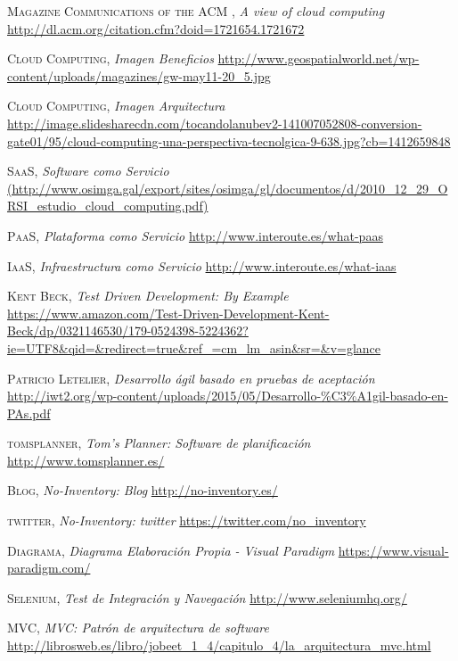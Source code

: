 \documentclass[a4paper,11pt]{book}
\begin{document}
\begin{thebibliography}{aaaa}
 \textsc{Magazine Communications of the ACM },
\textit{A view of cloud computing}
\url{http://dl.acm.org/citation.cfm?doid=1721654.1721672}


 \textsc{Cloud Computing},
\textit{Imagen Beneficios}
\url{http://www.geospatialworld.net/wp-content/uploads/magazines/gw-may11-20_5.jpg}

 \textsc{Cloud Computing},
\textit{Imagen Arquitectura}
\url{http://image.slidesharecdn.com/tocandolanubev2-141007052808-conversion-gate01/95/cloud-computing-una-perspectiva-tecnolgica-9-638.jpg?cb=1412659848}

 \textsc{SaaS},
\textit{Software como Servicio}
\url{(http://www.osimga.gal/export/sites/osimga/gl/documentos/d/2010_12_29_ORSI_estudio_cloud_computing.pdf)} 

 \textsc{PaaS},
\textit{Plataforma como Servicio}
\url{http://www.interoute.es/what-paas} 

 \textsc{IaaS},
\textit{Infraestructura como Servicio}
\url{http://www.interoute.es/what-iaas} 

 \textsc{Kent Beck},
\textit{Test Driven Development: By Example}
\url{https://www.amazon.com/Test-Driven-Development-Kent-Beck/dp/0321146530/179-0524398-5224362?ie=UTF8&qid=&redirect=true&ref_=cm_lm_asin&sr=&v=glance}


 \textsc{Patricio Letelier},
\textit{Desarrollo ágil basado en pruebas de aceptación}
\url{http://iwt2.org/wp-content/uploads/2015/05/Desarrollo-\%C3\%A1gil-basado-en-PAs.pdf}

 \textsc{tomsplanner},
\textit{Tom's Planner: Software de planificación}
\url{http://www.tomsplanner.es/}

 \textsc{Blog},
\textit{No-Inventory: Blog}
\url{http://no-inventory.es/}

 \textsc{twitter},
\textit{No-Inventory: twitter}
\url{https://twitter.com/no_inventory}

 \textsc{Diagrama},
\textit{Diagrama Elaboración Propia - Visual Paradigm}
\url{https://www.visual-paradigm.com/}




 \textsc{Selenium},
\textit{Test de Integración y Navegación}
\url{http://www.seleniumhq.org/}

 \textsc{MVC},
\textit{MVC: Patrón de arquitectura de software }
\url{http://librosweb.es/libro/jobeet_1_4/capitulo_4/la_arquitectura_mvc.html}


\end{thebibliography}
\end{document}
